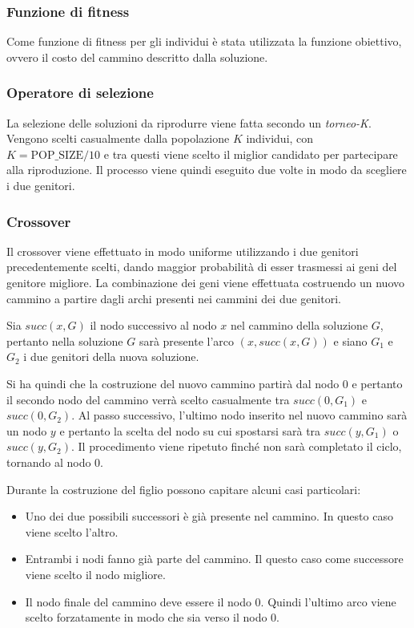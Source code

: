 \subsubsection{Funzione di fitness}

Come funzione di fitness per gli individui è stata utilizzata la funzione obiettivo, ovvero il costo del cammino descritto dalla soluzione.

\subsubsection{Operatore di selezione}

La selezione delle soluzioni da riprodurre viene fatta secondo un \textit{torneo-K}. Vengono scelti casualmente dalla popolazione $K$ individui, con $K = \text{POP\_SIZE}/10$ e tra questi viene scelto il miglior candidato per partecipare alla riproduzione.
Il processo viene quindi eseguito due volte in modo da scegliere i due genitori.

\subsubsection{Crossover}

Il crossover viene effettuato in modo uniforme utilizzando i due genitori precedentemente scelti, dando maggior probabilità di esser trasmessi ai geni del genitore migliore.
La combinazione dei geni viene effettuata costruendo un nuovo cammino a partire dagli archi presenti nei cammini dei due genitori.

Sia $succ(x, G)$ il nodo successivo al nodo $x$ nel cammino della soluzione $G$, pertanto nella soluzione $G$ sarà presente l'arco $(x, succ(x,G))$ e siano $G_1$ e $G_2$ i due genitori della nuova soluzione.

Si ha quindi che la costruzione del nuovo cammino partirà dal nodo 0 e pertanto il secondo nodo del cammino verrà scelto casualmente tra $succ(0,G_1)$ e $succ(0,G_2)$.
Al passo successivo, l'ultimo nodo inserito nel nuovo cammino sarà un nodo $y$ e pertanto la scelta del nodo su cui spostarsi sarà tra $succ(y,G_1)$ o $succ(y, G_2)$.
Il procedimento viene ripetuto finché non sarà completato il ciclo, tornando al nodo 0.

Durante la costruzione del figlio possono capitare alcuni casi particolari:

\begin{itemize}
	\item Uno dei due possibili successori è già presente nel cammino. In questo caso viene scelto l'altro.
	\item Entrambi i nodi fanno già parte del cammino. Il questo caso come successore viene scelto il nodo migliore.
	\item Il nodo finale del cammino deve essere il nodo 0. Quindi l'ultimo arco viene scelto forzatamente in modo che sia verso il nodo 0.
\end{itemize}

